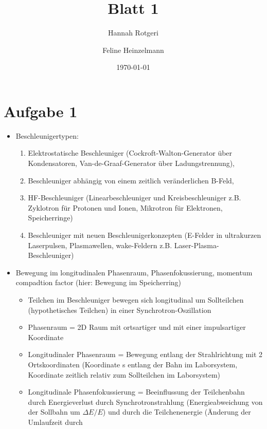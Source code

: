 \documentclass[11pt,a4paper]{article}
\title{Blatt 1}
\date{\today}
\author{Hannah Rotgeri \and Feline Heinzelmann}
\begin{document}
    \maketitle

    \section*{Aufgabe 1}
    \begin{itemize}
        \item Beschleunigertypen: \
            \begin{enumerate}[label=(\roman*)]
                \item Elektrostatische Beschleuniger (Cockroft-Walton-Generator über Kondensatoren, Van-de-Graaf-Generator über Ladungstrennung), 
                \item Beschleuniger abhängig von einem zeitlich veränderlichen B-Feld,
                \item HF-Beschleuniger (Linearbeschleuniger und Kreisbeschleuniger z.B. Zyklotron für Protonen und Ionen, Mikrotron für 
                Elektronen, Speicherringe) 
                \item Beschleuniger mit neuen Beschleunigerkonzepten (E-Felder in ultrakurzen Laserpulsen, Plasmawellen, wake-Feldern 
                z.B. Laser-Plasma-Beschleuniger)
            \end{enumerate}
        \item Bewegung im longitudinalen Phasenraum, Phasenfokussierung, momentum compadtion factor (hier: Bewegung im Speicherring)
            \begin{itemize}
                \item Teilchen im Beschleuniger bewegen sich longitudinal um Sollteilchen (hypothetisches Teilchen) in einer 
                Synchrotron-Oszillation
                \item Phasenraum = 2D Raum mit ortsartiger und mit einer impulsartiger Koordinate
                \item Longitudinaler Phasenraum = Bewegung entlang der Strahlrichtung mit 2 Ortskoordinaten (Koordinate s entlang 
                der Bahn im Laborsystem, Koordinate zeitlich relativ zum Sollteilchen im Laborsystem)
                \item Longitudinale Phasenfokussierung = Beeinflussung der Teilchenbahn durch Energieverlust durch Synchrotronstrahlung 
                (Energieabweichung von der Sollbahn um \( \Delta E/E \)) und durch die Teilchenenergie (Änderung der Umlaufzeit durch 

\end{itemize}
\end{itemize}
\end{document}

